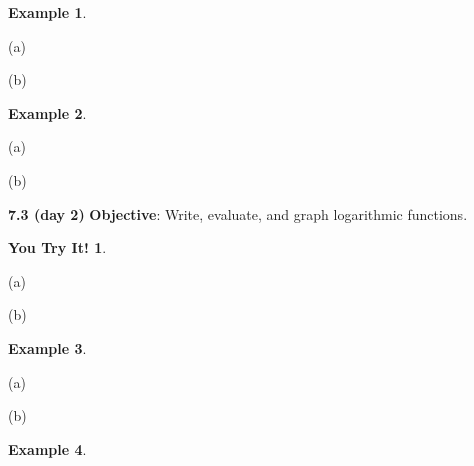\documentclass{report}
\theoremstyle{definition}
\newtheorem{example}{\bf Example}
\newtheorem{youtry}{\bf You Try It!}
\begin{document}
 \begin{example}

 \end{example}
\begin{minipage}[t]{0.45\linewidth}
(a) 
\end{minipage}
 \hfill
\begin{minipage}[t]{0.45\linewidth}
(b) 
\end{minipage}
\vfill
\begin{example}

\end{example}

\begin{minipage}[t]{0.45\linewidth}
(a) 
\end{minipage}
 \hfill
\begin{minipage}[t]{0.45\linewidth}
(b) 
\end{minipage}
\vfill

 
 \noindent{}
 
 
 \newpage

\noindent\Large{\textbf{7.3 (day 2)}} 
  \indent\hfill\small\noindent \textbf{Objective}: Write, evaluate, and graph logarithmic functions.  \normalsize\\

 
 \begin{youtry}

 \end{youtry}
 
\begin{minipage}[t]{0.45\linewidth}
(a) 
\end{minipage}
 \hfill
 \begin{minipage}[t]{0.45\linewidth}
(b) 
\end{minipage}
\vfill
\vfill
 
 \begin{example}

 \end{example}
\begin{minipage}[t]{0.45\linewidth}
(a) 
\end{minipage}
 \hfill
\begin{minipage}[t]{0.45\linewidth}

(b)
\end{minipage}
\vfill

\begin{example}
\end{example}
\end{document}
